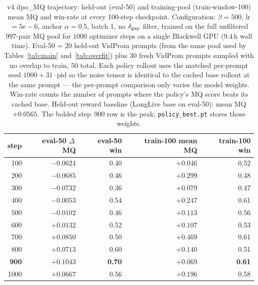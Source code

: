 \documentclass{article}
\begin{document}
\begin{table}[t]
\centering
\caption{v4 dpo\_MQ trajectory: held-out (eval-50) and training-pool (train-window-100) mean MQ and win-rate at every 100-step checkpoint. Configuration: $\beta=500$, lr$=5\mathrm{e}{-}6$, anchor $\alpha=0.5$, batch 1, no $\delta_{\rm gap}$ filter, trained on the full unfiltered $997$-pair MQ pool for $1000$ optimizer steps on a single Blackwell GPU ($9.4$\,h wall time). Eval-50 = $20$ held-out VidProm prompts (from the same pool used by Tables~\ref{tab:main} and~\ref{tab:overfit}) plus $30$ fresh VidProm prompts sampled with no overlap to train, $50$ total. Each policy rollout uses the matched per-prompt seed $1000 + 31 \cdot \text{pid}$ so the noise tensor is identical to the cached base rollout at the same prompt — the per-prompt comparison only varies the model weights. Win-rate counts the number of prompts where the policy's MQ score beats its cached base. Held-out reward baseline (LongLive base on eval-50): mean MQ $+0.0565$. The bolded step~$900$ row is the peak; \texttt{policy\_best.pt} stores those weights.}
\label{tab:v4traj}
\begin{tabular}{rrrrr}
\toprule
step & eval-50 $\Delta$\,MQ & eval-50 win & train-100 mean MQ & train-100 win \\
\midrule
100 & $-0.0624$ & 0.40 & $+0.046$ & 0.52 \\
200 & $-0.0685$ & 0.46 & $+0.299$ & 0.48 \\
300 & $-0.0732$ & 0.36 & $+0.079$ & 0.47 \\
400 & $-0.0053$ & 0.54 & $+0.247$ & 0.61 \\
500 & $-0.0102$ & 0.46 & $+0.113$ & 0.56 \\
600 & $+0.0132$ & 0.52 & $+0.107$ & 0.53 \\
700 & $+0.0850$ & 0.50 & $+0.469$ & 0.61 \\
800 & $+0.0713$ & 0.60 & $+0.140$ & 0.51 \\
\textbf{900} & \textbf{$+0.1043$} & \textbf{0.70} & \textbf{$+0.069$} & \textbf{0.61} \\
1000 & $+0.0667$ & 0.56 & $+0.196$ & 0.58 \\
\bottomrule
\end{tabular}
\end{table}
\end{document}
